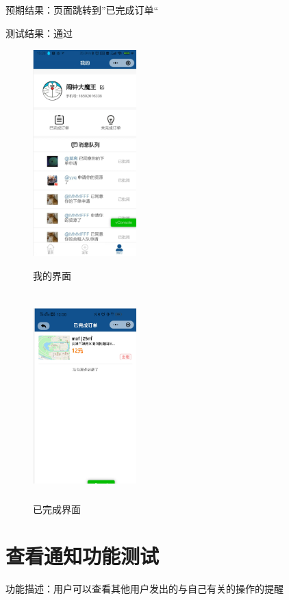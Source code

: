    预期结果：页面跳转到”已完成订单“
   
   测试结果：通过
   
   \begin{figure}[htbp]
       \centering
       \begin{minipage}[t]{0.48\textwidth}
       \centering
       \includegraphics[width=4cm,height=8cm]{test/image/test49.png} 
    
      \caption{我的界面} 
       \end{minipage}
       \begin{minipage}[t]{0.48\textwidth}
        \centering
        \includegraphics[width=4cm,height=8cm]{test/image/test50.png} 
     
       \caption{已完成界面}
    \end{minipage}
       \end{figure}
      \newpage 
   \section{查看通知功能测试}
   功能描述：用户可以查看其他用户发出的与自己有关的操作的提醒
   
